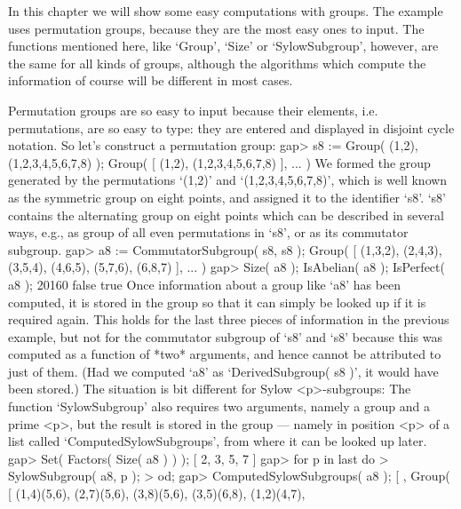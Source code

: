 
In this  chapter we will  show  some easy  computations with groups.  The
example uses permutation groups,  because they are  the most easy ones to
input.   The   functions  mentioned   here,   like   `Group',  `Size'  or
`SylowSubgroup', however, are the same for  all kinds of groups, although
the algorithms which compute the information of  course will be different
in most cases.


Permutation  groups are so  easy  to input  because their elements,  i.e.
permutations, are  so  easy to type:  they are  entered and displayed  in
disjoint cycle notation. So let's construct a permutation group:
\beginexample
    gap> s8 := Group( (1,2), (1,2,3,4,5,6,7,8) );
    Group( [ (1,2), (1,2,3,4,5,6,7,8) ], ... )
\endexample
We   formed  the  group  generated  by   the  permutations  `(1,2)'   and
`(1,2,3,4,5,6,7,8)',  which is well known as the symmetric group on eight
points,  and  assigned  it  to the  identifier `s8'.   `s8' contains  the
alternating group on eight points which can be described in several ways,
e.g., as group of  all even permutations in  `s8',  or  as its commutator
subgroup.
\beginexample
    gap> a8 := CommutatorSubgroup( s8, s8 );
    Group( [ (1,3,2), (2,4,3), (3,5,4), (4,6,5), (5,7,6), (6,8,7) ], ... )
    gap> Size( a8 ); IsAbelian( a8 ); IsPerfect( a8 );
    20160
    false
    true
\endexample
Once information about a group like `a8'  has been computed, it is stored
in the group so that it can simply be looked  up if it is required again.
This   holds for the  last three  pieces  of information  in the previous
example, but  not for the commutator   subgroup of `s8' and  `s8' because
this was computed as  a function of *two* arguments,  and hence cannot be
attributed to just of them. (Had we computed `a8' as `DerivedSubgroup( s8
)', it would have been stored.) The  situation is bit different for Sylow
<p>-subgroups: The  function `SylowSubgroup' also requires two arguments,
namely a group and a prime <p>, but the result is stored in the group ---
namely  in position <p> of   a list called `ComputedSylowSubgroups', from
where it can be looked up later.
\beginexample
    gap> Set( Factors( Size( a8 ) ) );
    [ 2, 3, 5, 7 ]
    gap> for p  in last  do
    >      SylowSubgroup( a8, p );
    >    od;
    gap> ComputedSylowSubgroups( a8 );
    [ , Group( [ (1,4)(5,6), (2,7)(5,6), (3,8)(5,6), (3,5)(6,8), (1,2)(4,7), 
